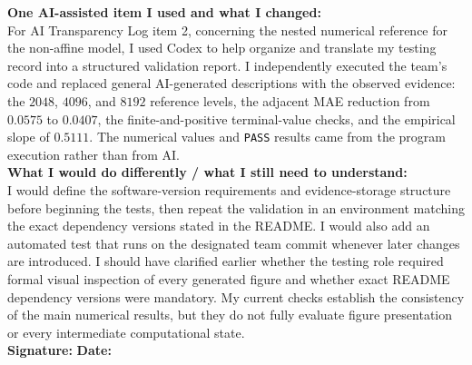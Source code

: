 \documentclass[11pt,a4paper]{article}
\theoremstyle{definition}
\theoremstyle{remark}
\begin{document}
\begin{formbox}
\textbf{One AI-assisted item I used and what I changed:}\\
For AI Transparency Log item 2, concerning the nested numerical reference for the non-affine model, I used Codex to help organize and translate my testing record into a structured validation report. I independently executed the team's code and replaced general AI-generated descriptions with the observed evidence: the \(2048\), \(4096\), and \(8192\) reference levels, the adjacent MAE reduction from \(0.0575\) to \(0.0407\), the finite-and-positive terminal-value checks, and the empirical slope of \(0.5111\). The numerical values and \texttt{PASS} results came from the program execution rather than from AI.\\[0.4em]

\textbf{What I would do differently / what I still need to understand:}\\
I would define the software-version requirements and evidence-storage structure before beginning the tests, then repeat the validation in an environment matching the exact dependency versions stated in the README. I would also add an automated test that runs on the designated team commit whenever later changes are introduced. I should have clarified earlier whether the testing role required formal visual inspection of every generated figure and whether exact README dependency versions were mandatory. My current checks establish the consistency of the main numerical results, but they do not fully evaluate figure presentation or every intermediate computational state.\\[0.6em]

\textbf{Signature:} \underline{\hspace{4cm}}\qquad
\textbf{Date:} \underline{\hspace{2.5cm}}
\end{formbox}

\newpage


\end{document}
